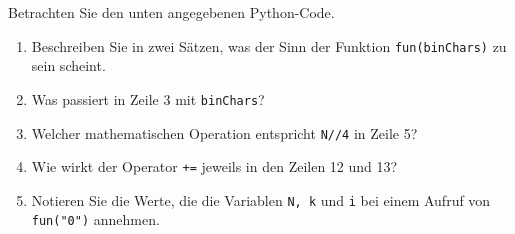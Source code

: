 Betrachten Sie den unten angegebenen Python-Code.
\begin{enumerate}
	\item Beschreiben Sie in zwei Sätzen, was der Sinn der Funktion \verb|fun(binChars)| zu sein scheint.
	\item Was passiert in Zeile 3 mit \verb|binChars|?
	\item Welcher mathematischen Operation entspricht \verb|N//4| in Zeile 5?
	\item Wie wirkt der Operator \verb|+=| jeweils in den Zeilen 12 und 13?
	\item Notieren Sie die Werte, die die Variablen \verb|N, k| und \verb|i| bei einem Aufruf von \verb|fun("0")| annehmen.
\end{enumerate}

